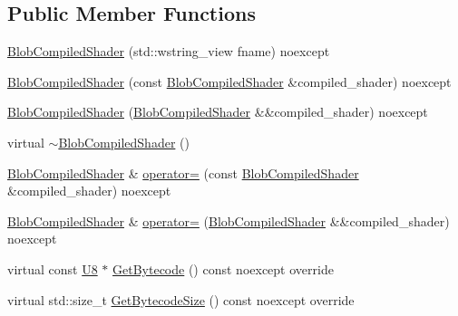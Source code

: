 \subsection*{Public Member Functions}
\begin{DoxyCompactItemize}
\item 
\mbox{\hyperlink{classmage_1_1rendering_1_1_blob_compiled_shader_acc17022773372a6e6b709c198285b861}{Blob\+Compiled\+Shader}} (std\+::wstring\+\_\+view fname) noexcept
\item 
\mbox{\hyperlink{classmage_1_1rendering_1_1_blob_compiled_shader_a7b63a87261abf6059c957af4061af201}{Blob\+Compiled\+Shader}} (const \mbox{\hyperlink{classmage_1_1rendering_1_1_blob_compiled_shader}{Blob\+Compiled\+Shader}} \&compiled\+\_\+shader) noexcept
\item 
\mbox{\hyperlink{classmage_1_1rendering_1_1_blob_compiled_shader_afa58cbbad81febc6c2470f6f1b0de2ce}{Blob\+Compiled\+Shader}} (\mbox{\hyperlink{classmage_1_1rendering_1_1_blob_compiled_shader}{Blob\+Compiled\+Shader}} \&\&compiled\+\_\+shader) noexcept
\item 
virtual \mbox{\hyperlink{classmage_1_1rendering_1_1_blob_compiled_shader_ac983a2506dfe81e8e8ceb2b9ffa420d6}{$\sim$\+Blob\+Compiled\+Shader}} ()
\item 
\mbox{\hyperlink{classmage_1_1rendering_1_1_blob_compiled_shader}{Blob\+Compiled\+Shader}} \& \mbox{\hyperlink{classmage_1_1rendering_1_1_blob_compiled_shader_a07f7bf56354508ad499133b821e2fdc5}{operator=}} (const \mbox{\hyperlink{classmage_1_1rendering_1_1_blob_compiled_shader}{Blob\+Compiled\+Shader}} \&compiled\+\_\+shader) noexcept
\item 
\mbox{\hyperlink{classmage_1_1rendering_1_1_blob_compiled_shader}{Blob\+Compiled\+Shader}} \& \mbox{\hyperlink{classmage_1_1rendering_1_1_blob_compiled_shader_a14954683e57897937b0e0178b5a726a4}{operator=}} (\mbox{\hyperlink{classmage_1_1rendering_1_1_blob_compiled_shader}{Blob\+Compiled\+Shader}} \&\&compiled\+\_\+shader) noexcept
\item 
virtual const \mbox{\hyperlink{namespacemage_a30677c03d683c4c35630c25f6ff3fb7f}{U8}} $\ast$ \mbox{\hyperlink{classmage_1_1rendering_1_1_blob_compiled_shader_a135655e22d372d55c2a3b6ea3e761852}{Get\+Bytecode}} () const noexcept override
\item 
virtual std\+::size\+\_\+t \mbox{\hyperlink{classmage_1_1rendering_1_1_blob_compiled_shader_a259291746904bba3ab8bc096329d641e}{Get\+Bytecode\+Size}} () const noexcept override
\end{DoxyCompactItemize}
